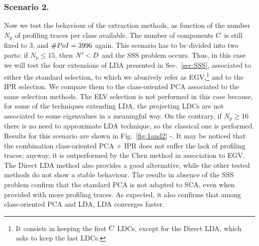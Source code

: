 \subsubsection{Scenario 2.}
Now we test the behaviour of the extraction methods, as function of the number $N_p$ of profiling traces per class available. The number of components $\newTraceLength$ is still fixed to 3, and $\numPoI=3996$ again. This scenario has to be divided into two parts: if $N_p\leq 15$, then $\numTraces[]'<\traceLength$ and the SSS problem occurs. Thus, in this case we will test the four extensions of LDA presented in Sec.~\ref{sec:SSS}, associated to either the standard selection, to which we abusively refer as EGV,\footnote{It consists in keeping the first $\newTraceLength$ LDCs, except for the Direct LDA, which asks to keep the last LDCs.} and to the IPR selection.  We compare them to the class-oriented PCA associated to the same selection methods. The ELV selection is not performed in this case because, for some of the techniques extending LDA, the projecting LDCs are not associated to some eigenvalues in a meaningful way. On the contrary, if $N_p\geq 16$ there is no need to approximate LDA technique, so the classical one is performed. Results for this scenario are shown in Fig.~\ref{fig:1and2} -. It may be noticed that the combination class-oriented PCA + IPR does not suffer the lack of profiling traces; anyway, it is outperformed by the Chen method in association to EGV. The Direct LDA method also provides a good alternative, while the other tested methods do not show a stable behaviour. The results in absence of the SSS problem confirm that the standard PCA is not adapted to SCA, even when provided with more profiling traces. As expected, it also confirms that among class-oriented PCA and LDA, LDA converges faster.



\medskip

